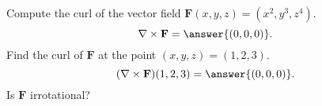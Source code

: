 \begin{problem}
Compute the curl of the vector field $\mathbf{F}(x,y,z) = (x^2, y^3, z^4)$.
\[
\nabla\times \mathbf{F} = \answer{(0,0,0)}.
\]
Find the curl of $\mathbf{F}$ at the point $(x,y,z) = (1,2,3)$.
\[
(\nabla\times \mathbf{F})(1,2,3) = \answer{(0,0,0)}.
\]
Is $\mathbf{F}$ irrotational?
\begin{multipleChoice}
\end{multipleChoice}
\end{problem}